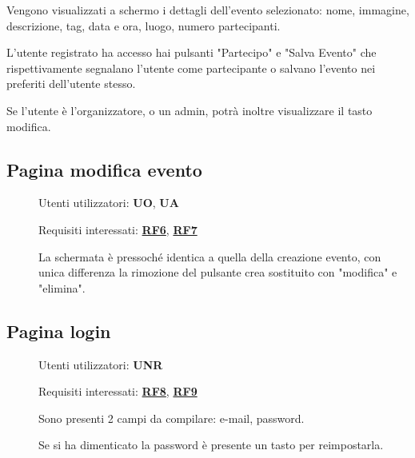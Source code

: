 \documentclass{article}
\begin{document}
\begin{description}
\begin{center}
          \end{center}
    \item[] Vengono visualizzati a schermo i dettagli dell'evento selezionato: nome, immagine, descrizione, tag, data e ora, luogo, numero partecipanti.
    \item[] L'utente registrato ha accesso hai pulsanti "Partecipo" e "Salva Evento" che rispettivamente segnalano l'utente come partecipante o salvano l'evento nei preferiti dell'utente stesso.
    \item[] Se l'utente è l'organizzatore, o un admin, potrà inoltre visualizzare il tasto modifica.
\end{description}
\clearpage
\subsection{Pagina modifica evento}
\begin{description}
    \item[] Utenti utilizzatori: \textbf{UO}, \textbf{UA}
    \item[] Requisiti interessati: \hyperref[rf_6]{\textbf{RF6}}, \hyperref[rf_7]{\textbf{RF7}}
    \item[] La schermata è pressoché identica a quella della creazione evento, con unica differenza la rimozione del pulsante crea sostituito con "modifica" e "elimina".
\end{description}
\subsection{Pagina login}
\begin{description}
    \item[] Utenti utilizzatori: \textbf{UNR}
    \item[] Requisiti interessati: \hyperref[rf_8]{\textbf{RF8}}, \hyperref[rf_9]{\textbf{RF9}}
    \item[] Sono presenti 2 campi da compilare: e-mail, password.
    \item[] Se si ha dimenticato la password è presente un tasto per reimpostarla.
\end{description}
\clearpage
\end{document}
